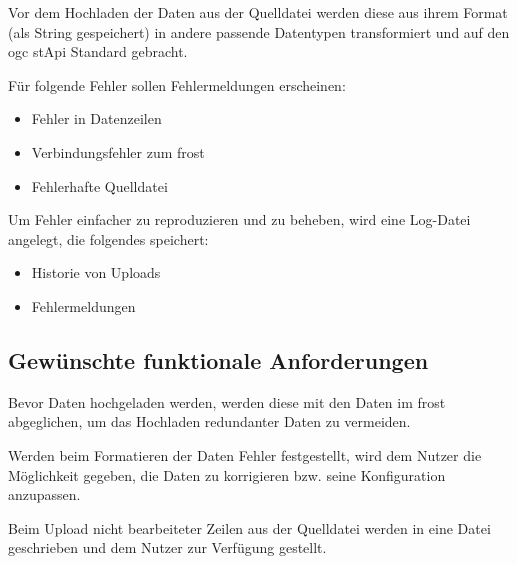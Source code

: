 \documentclass[a4paper, 12 pt]{article}
\begin{document}
	
	Vor dem Hochladen der Daten aus der Quelldatei werden diese aus ihrem Format (als String gespeichert) in andere passende Datentypen transformiert und auf den \gls{ogc} \gls{stApi} Standard gebracht.
	
	Für folgende Fehler sollen Fehlermeldungen erscheinen:
	\begin{itemize}
			\item Fehler in Datenzeilen
			\item Verbindungsfehler zum \gls{frost}
			\item Fehlerhafte Quelldatei
		\end{itemize}
	
	Um Fehler einfacher zu reproduzieren und zu beheben, wird eine Log-Datei angelegt, die folgendes speichert:
	\begin{itemize}
			\item Historie von Uploads
			\item Fehlermeldungen
		\end{itemize}
	

	\subsection{Gewünschte funktionale Anforderungen}
	
	
	
	
	Bevor Daten hochgeladen werden, werden diese mit den Daten im \gls{frost} abgeglichen, um das Hochladen redundanter Daten zu vermeiden.
	
	Werden beim Formatieren der Daten Fehler festgestellt, wird dem Nutzer die Möglichkeit gegeben, die Daten zu korrigieren bzw. seine Konfiguration anzupassen.	
	
	Beim Upload nicht bearbeiteter Zeilen aus der Quelldatei werden in eine Datei geschrieben und dem Nutzer zur Verfügung gestellt.
	
\end{document}
